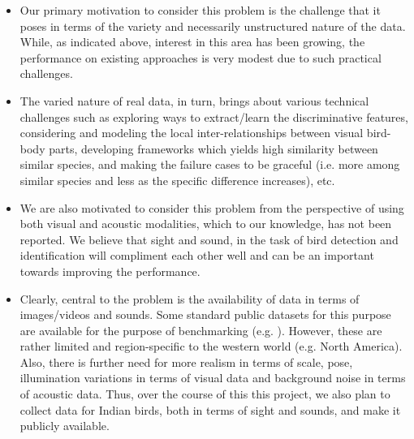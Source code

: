 \documentclass{article}
\begin{document}
\begin{itemize}

\item Our primary motivation to consider this problem is the challenge that it
poses in terms of the variety and necessarily unstructured nature of the data.
While, as indicated above, interest in this area has been growing, the
performance on existing approaches is very modest due to such practical
challenges. 

\item The varied nature of real data, in turn, brings about various technical
challenges such as exploring ways to extract/learn the discriminative features,
considering and modeling the local inter-relationships between visual bird-body
parts, developing frameworks which yields high similarity between similar
species, and making the failure cases to be graceful (i.e. more among similar
species and less as the specific difference increases), etc. 

\item We are also motivated to consider this problem from the perspective of
using both visual and acoustic modalities, which to our knowledge, has not been
reported. We believe that sight and sound, in the task of bird detection and
identification will compliment each other well and can be an important towards
improving the performance. 

\item Clearly, central to the problem is the availability of data in terms of
images/videos and sounds. Some standard public datasets for this purpose are
available for the purpose of benchmarking (e.g. \cite{cub}). However, these are
rather limited and region-specific to the western world (e.g. North America).
Also, there is further need for more realism in terms of scale, pose,
illumination variations in terms of visual data and background noise in terms of
acoustic data. Thus, over the course of this this project, we also plan to
collect data for Indian birds, both in terms of sight and sounds, and make it
publicly available.

\end{itemize}
 
\end{document}
